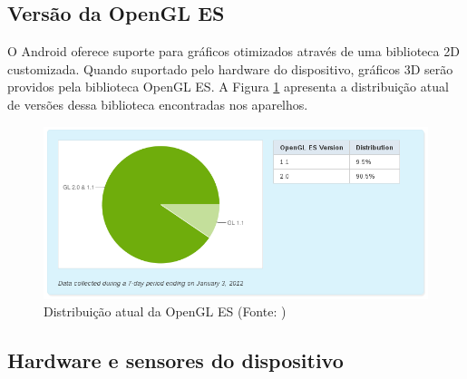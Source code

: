 \subsection{Versão da OpenGL ES}

O Android oferece suporte para gráficos otimizados através de uma biblioteca 2D 
customizada. Quando suportado pelo hardware do dispositivo, gráficos 3D serão 
providos pela biblioteca OpenGL ES. A Figura \ref{distribuicao_opengl} apresenta 
a distribuição atual de versões dessa biblioteca encontradas nos aparelhos.

\begin{figure}[h]
    \centering
    \includegraphics[width=15cm]{img/opengl}
    \caption{Distribuição atual da OpenGL ES (Fonte: \cite{opengl_versions})}
    \label{distribuicao_opengl}
\end{figure}


\subsection{Hardware e sensores do dispositivo}

